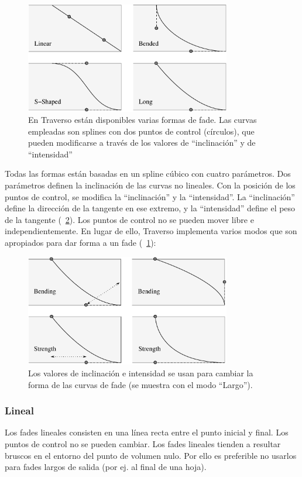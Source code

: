 \begin{figure}[t]
 \centering\includegraphics[width=0.8\textwidth]{../images/fades}
 \caption{En Traverso están disponibles varias formas de fade. Las curvas empleadas son splines con dos puntos de control (círculos), que pueden modificarse a través de los valores de ``inclinación'' y de ``intensidad''}
 \label{fig_fades01}
\end{figure}

Todas las formas están basadas en un spline cúbico con cuatro parámetros. Dos parámetros definen la inclinación de las curvas no lineales. Con la posición de los puntos de control, se modifica la ``inclinación'' y la ``intensidad''. La ``inclinación'' define la dirección de la tangente en ese extremo, y la ``intensidad'' define el peso de la tangente (\FigB~\ref{fig_fades02}). Los puntos de control no se pueden mover libre e independientemente. En lugar de ello, Traverso implementa varios modos que son apropiados para dar forma a un fade (\FigB~\ref{fig_fades01}):

\begin{figure}[t]
 \centering\includegraphics[width=0.8\textwidth]{../images/fades2}
 \caption{Los valores de inclinación e intensidad se usan para cambiar la forma de las curvas de fade (se muestra con el modo ``Largo'').}
 \label{fig_fades02}
\end{figure}

\subsubsection{Lineal}
Los fades lineales consisten en una línea recta entre el punto inicial y final. Los puntos de control no se pueden cambiar. Los fades lineales tienden a resultar bruscos en el entorno del punto de volumen nulo. Por ello es preferible no usarlos para fades largos de salida (por ej. al final de una hoja).

